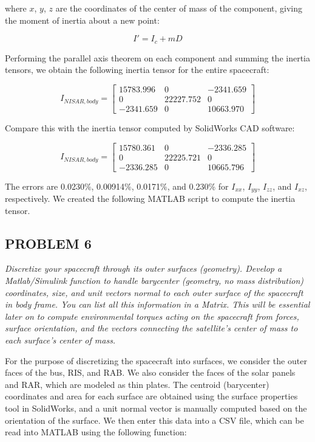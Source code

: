 where $x$, $y$, $z$ are the coordinates of the center of mass of the component, giving the moment of inertia about a new point:

\begin{equation*}
    I' = I_{c} + mD
\end{equation*}

Performing the parallel axis theorem on each component and summing the inertia tensors, we obtain the following inertia tensor for the entire spacecraft:

\begin{equation*}
I_{NISAR,body} =
\begin{bmatrix}
15783.996 & 0 & -2341.659 \\
0 & 22227.752 & 0 \\
-2341.659 & 0 & 10663.970
\end{bmatrix}
\end{equation*}

Compare this with the inertia tensor computed by SolidWorks CAD software:

\begin{equation*}
I_{NISAR,body} =
\begin{bmatrix}
15780.361 & 0 & -2336.285 \\
0 & 22225.721 & 0 \\
-2336.285 & 0 & 10665.796
\end{bmatrix}
\end{equation*}

The errors are 0.0230\%, 0.00914\%, 0.0171\%, and 0.230\% for $I_{xx}$, $I_{yy}$, $I_{zz}$, and $I_{xz}$, respectively. We created the following MATLAB script to compute the inertia tensor.



\subsection{PROBLEM 6}
\textit{Discretize your spacecraft through its outer surfaces (geometry). Develop a Matlab/Simulink function to handle barycenter (geometry, no mass distribution) coordinates, size, and unit vectors normal to each outer surface of the spacecraft in body frame. You can list all this information in a Matrix. This will be essential later on to compute environmental torques acting on the spacecraft from forces, surface orientation, and the vectors connecting the satellite’s center of mass to each surface’s center of mass.}

For the purpose of discretizing the spacecraft into surfaces, we consider the outer faces of the bus, RIS, and RAB. We also consider the faces of the solar panels and RAR, which are modeled as thin plates. The centroid (barycenter) coordinates and area for each surface are obtained using the surface properties tool in SolidWorks, and a unit normal vector is manually computed based on the orientation of the surface. We then enter this data into a CSV file, which can be read into MATLAB using the following function:

